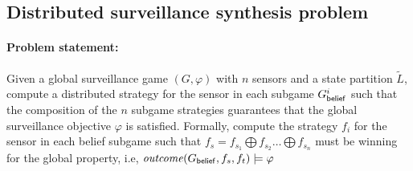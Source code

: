  




\subsection{Distributed surveillance synthesis problem}
\paragraph*{\textbf{Problem statement: }}Given a global surveillance game $(G,\varphi)$ with $n$ sensors and a state partition $\widetilde{L}$, compute a distributed strategy for the sensor in each subgame $G^i_{\mathsf{belief}}$ such that the composition of the $n$ subgame strategies guarantees that the global surveillance objective $\varphi$ is satisfied. Formally, compute the strategy $f_i$ for the sensor in each belief subgame such that $f_s = f_{s_1} \bigoplus f_{s_2} \dots \bigoplus f_{s_n}$ must be winning for the global property, i.e, $\mathit{outcome}(G_{\mathsf{belief}},f_{s},f_{t}) \models \varphi$





